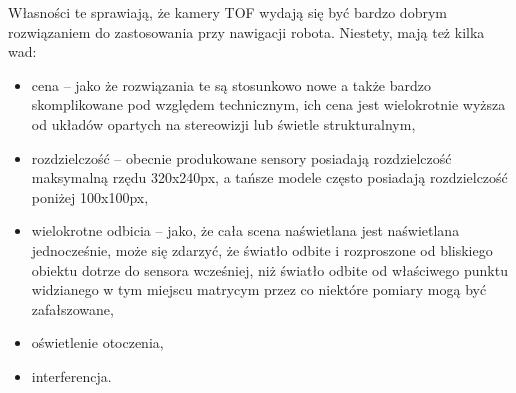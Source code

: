 Własności te sprawiają, że kamery TOF wydają się być bardzo dobrym rozwiązaniem
do zastosowania przy nawigacji robota. Niestety, mają też kilka wad:

\begin{itemize}
\item cena -- jako że rozwiązania te są stosunkowo nowe a także bardzo skomplikowane
pod względem technicznym, ich cena jest wielokrotnie wyższa od układów opartych na
stereowizji lub świetle strukturalnym,
\item rozdzielczość -- obecnie produkowane sensory posiadają rozdzielczość maksymalną
rzędu 320x240px, a tańsze modele często posiadają rozdzielczość poniżej 100x100px,
\item wielokrotne odbicia -- jako, że cała scena naświetlana jest naświetlana jednocześnie,
może się zdarzyć, że światło odbite i rozproszone od bliskiego obiektu dotrze do
sensora wcześniej, niż światło odbite od właściwego punktu widzianego w tym miejscu
matrycym przez co niektóre pomiary mogą być zafałszowane,
\item oświetlenie otoczenia,
\item interferencja.
\end{itemize}
